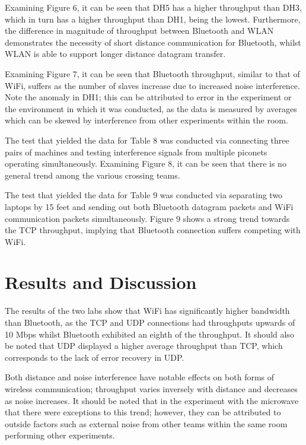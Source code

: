 \documentclass[twoside,twocolumn]{article}
\begin{document}
\hfill

\noindent Examining Figure 6, it can be seen that DH5 has a higher throughput than DH3, which in turn has a higher throughput than DH1, being the lowest. Furthermore, the difference in magnitude of throughput between Bluetooth and WLAN demonstrates the necessity of short distance communication for Bluetooth, whilst WLAN is able to support longer distance datagram transfer.

\hfill

\noindent Examining Figure 7, it can be seen that Bluetooth throughput, similar to that of WiFi, suffers as the number of slaves increase due to increased noise interference. Note the anomaly in DH1; this can be attributed to error in the experiment or the environment in which it was conducted, as the data is measured by averages which can be skewed by interference from other experiments within the room.

\hfill

\noindent The test that yielded the data for Table 8 was conducted via connecting three pairs of machines and testing interference signals from multiple piconets operating simultaneously. Examining Figure 8, it can be seen that there is no general trend among the various crossing teams.

\hfill

\noindent The test that yielded the data for Table 9 was conducted via separating two laptops by 15 feet and sending out both Bluetooth datagram packets and WiFi communication packets simultaneously. Figure 9 shows a strong trend towards the TCP throughput, implying that Bluetooth connection suffers competing with WiFi.

\newpage


\section{Results and Discussion}

The results of the two labs show that WiFi has significantly higher bandwidth than Bluetooth, as the TCP and UDP connections had throughputs upwards of 10 Mbps whilst Bluetooth exhibited an eighth of the throughput. It should also be noted that UDP displayed a higher average throughput than TCP, which corresponds to the lack of error recovery in UDP.

\hfill

\noindent Both distance and noise interference have notable effects on both forms of wireless communication; throughput varies inversely with distance and decreases as noise increases. It should be noted that in the experiment with the microwave that there were exceptions to this trend; however, they can be attributed to outside factors such as external noise from other teams within the same room performing other experiments.
\end{document}
